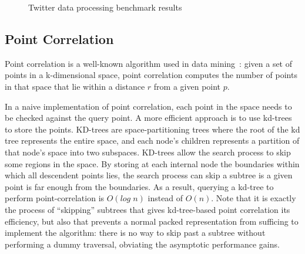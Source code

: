 \documentclass[showabstract,showacknowledgments,showpreface,showdedication]{iuphd}
\theoremstyle{nonumberplain}
\begin{document}
\begin{figure}
  \centering
  
  \caption{Twitter data processing benchmark results}
  \label{fig:twitter_slowdown_plot}
\end{figure}

\subsection{Point Correlation}

Point correlation  is a well-known algorithm used in data mining~\cite{gray2000n}:
given a set of points in a k-dimensional space, point correlation computes the number of points in that space  that lie within a
distance $r$ from a given point $p$. 




In a naive implementation of point correlation, each point in the space needs
to be checked against the query point. 
A more efficient approach is to use kd-trees~\cite{bentley75} to store the
points. KD-trees are space-partitioning trees where the root of the kd tree represents the entire space, and each node's children represents a partition of that node's space into two subspaces.
KD-trees allow the search
process to skip some regions in the space. By storing at each internal node
the boundaries within which all descendent points lies, the search process can
skip a subtree is a given point is far enough from the boundaries. As a
result, querying a kd-tree to perform point-correlation is $O(log\; n)$ instead
of $O(n)$. Note that it is exactly the process of ``skipping'' subtrees that
gives kd-tree-based point correlation its efficiency, but also that prevents a
normal packed representation from sufficing to implement the algorithm: there
is no way to skip past a subtree without performing a dummy traversal,
obviating the asymptotic performance gains.
\end{document}
